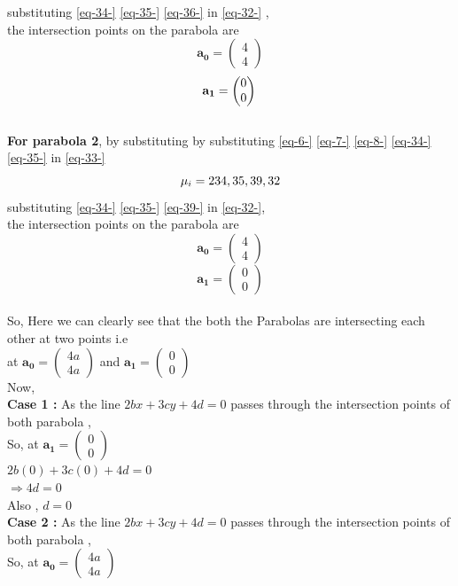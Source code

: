 \documentclass[journal,12pt,twocolumn]{IEEEtran}
\newcommand{\myvec}[1]{\ensuremath{\begin{pmatrix}#1\end{pmatrix}}}
\let\vec\mathbf
\let\vec\mathbf
\begin{document}
{substituting \eqref{eq-34-} \eqref{eq-35-} \eqref{eq-36-} in \eqref{eq-32-} ,\\
the intersection points on the parabola are
\begin{equation}
\vec{a_0}=\myvec{4\\4}
\end{equation}
\begin{equation}
\vec{a_1}=\myvec{0\\0} \\ 
\end{equation}\\
\textbf{For parabola 2},
by substituting by substituting \eqref{eq-6-} \eqref{eq-7-} \eqref{eq-8-} \eqref{eq-34-} \eqref{eq-35-}  in \hspace{1mm} \eqref{eq-33-}
\begin{equation}
\mu_i=2
\label{eq-39-} \\ 34,35,39,32
\end{equation}
substituting \eqref{eq-34-} \eqref{eq-35-} \eqref{eq-39-} in \eqref{eq-32-},\\
the intersection points on the parabola are
\begin{equation}
\vec{a_0}=\myvec{4\\4}
\end{equation}
\begin{equation}
\vec{a_1}=\myvec{0\\0}
\end{equation}\\
So, Here we can clearly see that the both the Parabolas are intersecting each other at two points i.e \\
at  $\vec{a_0}=\myvec{4a\\4a}$ and $\vec{a_1}=\myvec{0\\0}$
\\
Now,\\
\textbf{Case 1 :}
As the line $ 2bx+3cy+4d = 0$ passes through the intersection points of both parabola ,\\
So, at $\vec{a_1}=\myvec{0\\0}$
\\
$ 2b(0)+3c(0)+4d = 0$ \\
$ \Rightarrow 4d =0 $ \\
Also , $d = 0$\\
\textbf{Case 2 :}
As the line $ 2bx+3cy+4d = 0$ passes through the intersection points of both parabola ,\\
So, at $\vec{a_0}=\myvec{4a\\4a}$
\\
}
\end{document}
